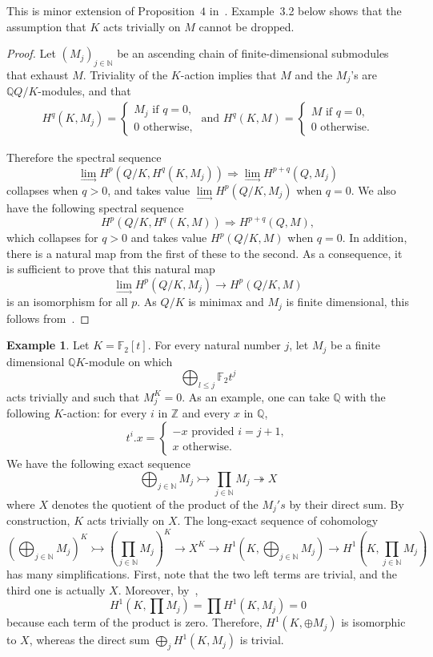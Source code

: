 \documentclass[11pt]{article}
\theoremstyle{definition}
\newtheorem{exam}[theo]{Example}
\numberwithin{equation}{section}
\numberwithin{figure}{section}
\numberwithin{table}{section}
\newcommand{\Q}{\mathbb{Q}}
\newcommand{\Z}{\mathbb{Z}}
\newcommand{\N}{\mathbb{N}}
\newcommand{\F}{\mathbb{F}}
\newcommand{\mono}{\rightarrowtail}
\newcommand{\epi}{\twoheadrightarrow}
\begin{document}
This is minor extension of Proposition~$4$ in~\cite{K84}. Example~3.2 below shows that the assumption that $K$ acts trivially on $M$ cannot be dropped.
\begin{proof}
Let $(M_j)_{j\in \N}$ be an ascending chain of finite-dimensional submodules that exhaust $M$. Triviality of the $K$-action implies that $M$ and the $M_j$'s are $\Q Q/K$-modules, and that
\begin{align*}
H^q(K, M_j) =
\begin{cases}
M_j \text{ if } q = 0, \\
0 \text{ otherwise,}
\end{cases} \text{ and } H^q(K, M) =
\begin{cases}
M \text{ if } q = 0, \\
0 \text{ otherwise.}
\end{cases}
\end{align*}

Therefore the spectral sequence
\[
\lim_\rightarrow H^p(Q/K, H^q(K, M_j)) \Rightarrow \lim_\rightarrow H^{p+q}(Q, M_j)
\]
collapses when $q > 0$, and takes value $ \lim\limits_\rightarrow H^p(Q/K, M_j)$ when $q=0$. We also have the following spectral sequence
\[
H^p(Q/K, H^q(K, M)) \Rightarrow H^{p+q}(Q, M),
\]
which collapses for $q > 0$ and takes value $H^p(Q/K, M)$ when $q = 0$. In addition, there is a natural map from the first of these to the second. As a consequence, it is sufficient to prove that this natural map
\[
\lim_\rightarrow H^p(Q/K, M_j) \rightarrow H^p(Q/K, M)
\]
is an isomorphism for all $p$. As $Q/K$ is minimax and $M_j$ is finite dimensional, this follows from~\cite[Proposition~$4$]{K84}.
\end{proof}

\begin{exam}
Let $K = \F_2[t]$. For every natural number $j$, let $M_j$ be a finite dimensional $\Q K$-module on which
\[
\bigoplus_{l \leqslant j} \F_2 t^j
\]
acts trivially and such that $M_j^K =0$. As an example, one can take $\Q$ with the following $K$-action: for every $i$ in $\Z$ and every $x$ in $\Q$,
\[
t^i.x =
\begin{cases}
- x \text{ provided } i = j + 1, \\
x \text{ otherwise.}
\end{cases}
\]
We have the following exact sequence
\[
\bigoplus_{j\in\N} M_j \mono \prod_{j\in\N} M_j \epi X
\]
where $X$ denotes the quotient of the product of the $M_j's$ by their direct sum. By construction, $K$ acts trivially on $X$. The long-exact sequence of cohomology
\[
\left(\bigoplus_{j\in\N} M_j\right)^K \mono \left(\prod_{j\in\N} M_j\right)^K \rightarrow X^K \rightarrow H^1\left(K, \bigoplus_{j\in\N} M_j\right) \rightarrow H^1\left(K, \prod_{j\in\N} M_j\right)
\]
has many simplifications. First, note that the two left terms are trivial, and the third one is actually $X$. Moreover, by~\cite{B},
\[
H^1(K, \prod M_j) = \prod H^1(K, M_j) =0
\]
because each term of the product is zero. Therefore, $H^1(K, \oplus M_j)$ is isomorphic to $X$, whereas the direct sum $\bigoplus_j H^1(K, M_j)$ is trivial.
\end{exam}
\end{document}
